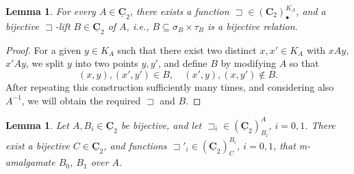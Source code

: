 \documentclass[12pt]{amsart}
\numberwithin{equation}{section}
\theoremstyle{plain}
\newtheorem{lemma}[theorem]{Lemma}
\theoremstyle{definition}
\newcommand \sqsp{\sqsupset}
\newcommand \CCb{\mathbf{C}}
\newcommand \CCub{\underline{\mathbf{C}}}
\begin{document}
\begin{lemma}
\label{le:C2Bijective}
For every $A \in \CCub_2$, there exists a function $\sqsp \in (\CCb_2)^{K_A}_\bullet$, and a bijective $\sqsp$-lift $B \in \CCub_2$ of $A$, i.e., $B \subseteq  \sigma_{B} \times \tau_{B}$ is a bijective relation. 
\end{lemma}

\begin{proof}
For a given $y \in K_A$ such that there exist two distinct $x,x' \in K_A$ with $x A y$, $x' A y$, we split $y$ into two points $y, y'$, and define $B$ by modifying $A$ so that $$(x,y), (x',y') \in B, \quad (x',y), (x,y') \not \in B.$$ After repeating this construction sufficiently many times, and considering also $A^{-1}$, we will obtain the required $\sqsp$ and $B$. 
\end{proof}
	
\begin{lemma}
\label{le:C2MAmalgamation}
Let   $A, {B_i} \in \CCub_2$ be bijective, and let $\sqsp_i \in (\CCub_2)^{A}_{B_i}$, $i=0,1$. There exist a bijective  $C  \in \CCub_2$, and functions $\sqsp'_i \in (\CCub_2)^{B_i}_{C}$, $i=0,1$, that m-amalgamate $B_0$, $B_1$ over $A$. %
\end{lemma}
\end{document}

